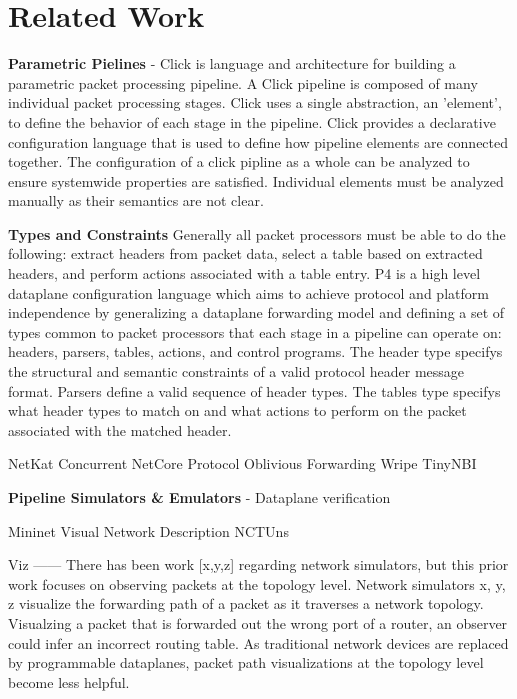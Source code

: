 \section{Related Work}


\textbf{Parametric Pielines} - Click \cite{click} is language and architecture 
for building a parametric packet processing pipeline. A Click pipeline is 
composed of many individual packet processing stages. Click uses a single 
abstraction, an 'element', to define the behavior of each stage in the pipeline.
Click provides a declarative configuration language that is used to define
how pipeline elements are connected together. The configuration of a click
pipline as a whole can be analyzed to ensure systemwide properties are
satisfied. Individual elements must be analyzed manually as their semantics
are not clear. 

\textbf{Types and Constraints}
Generally all packet processors must be able to do the 
following: extract headers from packet data, select a table based on extracted 
headers, and perform actions associated with a table entry. P4\cite{p4} is a 
high level dataplane configuration language which aims to
achieve protocol and platform independence by generalizing a dataplane 
forwarding model and defining a set of types common to packet processors that 
each stage in a pipeline can operate on: headers, parsers, tables, actions, and
control programs. The header type specifys the structural and semantic 
constraints of a valid protocol header message format. Parsers define a valid 
sequence of header types. The tables type specifys what header types to match 
on and what actions to perform on the packet associated with the matched header.

NetKat\cite{netkat}
Concurrent NetCore\cite{cnetcore}
Protocol Oblivious Forwarding\cite{pof}
Wripe \cite{wripe}
TinyNBI \cite{tinynbi}

\textbf{Pipeline Simulators \& Emulators} -
Dataplane verification


Mininet\cite{mininet}
Visual Network Description \cite{vnd}
NCTUns \cite{nctuns}

Viz
------
There has been work [x,y,z] regarding network simulators, but this prior work focuses on observing packets at the topology level. Network simulators x, y, z visualize the forwarding path of a packet as it traverses a network topology. Visualzing a packet that is forwarded out the wrong port of a router, an observer could infer an incorrect routing table. As traditional network devices are replaced by programmable dataplanes, packet path visualizations at the topology level become less helpful.

